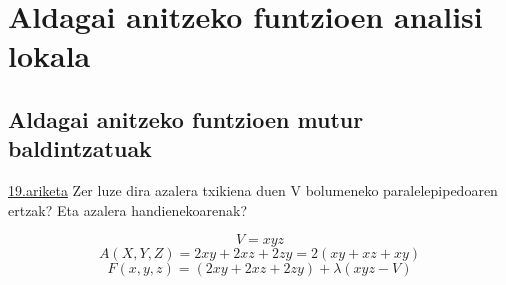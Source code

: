 \chapter{Aldagai anitzeko funtzioen analisi lokala}
\section{Aldagai anitzeko funtzioen mutur baldintzatuak}
\underline{19.ariketa} Zer luze dira azalera txikiena duen V bolumeneko paralelepipedoaren ertzak? Eta azalera handienekoarenak?

\begin{equation*}
    V = xyz
\end{equation*}
\begin{equation*}
    A(X,Y,Z) = 2xy + 2xz + 2zy = 2(xy+xz+xy)
\end{equation*}
\begin{equation*}
    F(x,y,z) = (2xy + 2xz + 2zy) + \lambda(xyz-V)
\end{equation*}

